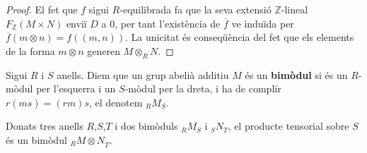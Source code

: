 \begin{proof}
El fet que $f$ sigui $R$-equilibrada fa que la seva extensió $\mathbb{Z}$-lineal $F_{\mathbb{Z}}(M\times N)$ enviï $D$ a $0$, per tant l'existència de $\overline{f}$ ve induïda per $\overline{f}(m\otimes n) = f((m,n))$. La unicitat és conseqüència del fet que els elements de la forma $m\otimes n$ generen $M\otimes_RN$.
\end{proof}

\begin{definition}
Sigui $R$ i $S$ anells. Diem que un grup abelià additiu $M$ és un \textbf{bimòdul} si és un $R$-mòdul per l'esquerra i un $S$-mòdul per la dreta, i ha de complir $r(ms)=(rm)s$, el denotem $_R{M_S}$.
\end{definition}

\begin{prop}
 Donats tres anells $R$,$S$,$T$ i dos bimòduls $_R{M_S}$ i $_S{N_T}$, el producte tensorial sobre $S$ és un bimòdul $_R{M \otimes N}_T$. 
\end{prop}

